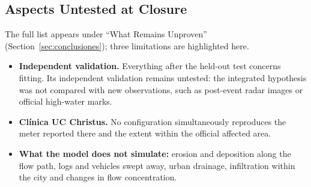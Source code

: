 \subsection{Aspects Untested at Closure}
The full list appears under ``What Remains Unproven'' (Section~\ref{sec:conclusiones}); three limitations are highlighted here.
\begin{itemize}
\item \textbf{Independent validation.} Everything after the held-out test concerns fitting. Its independent validation remains untested: the integrated hypothesis was not compared with new observations, such as post-event radar images or official high-water marks.
\item \textbf{Clínica UC Christus.} No configuration simultaneously reproduces the meter reported there and the extent within the official affected area.
\item \textbf{What the model does not simulate:} erosion and deposition along the flow path, logs and vehicles swept away, urban drainage, infiltration within the city and changes in flow concentration.
\end{itemize}

